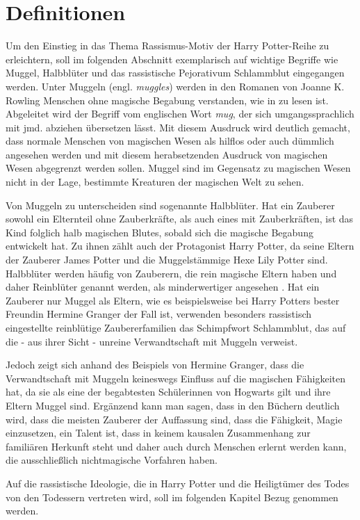 \section{Definitionen}
Um den Einstieg in das Thema \glqq Rassismus-Motiv der  \glq Harry Potter\grq-Reihe\grqq{} zu erleichtern, soll im folgenden Abschnitt exemplarisch auf wichtige Begriffe wie \glqq Muggel\grqq, \glqq Halbblüter\grqq{} und das rassistische Pejorativum \glqq Schlammblut\grqq{} eingegangen werden.
Unter \glqq Muggeln\grqq{} (engl. \emph{muggles}) werden in den Romanen von Joanne K. Rowling Menschen ohne magische Begabung verstanden, wie in \cite[S. \,61]{JKR97} zu lesen ist. 
Abgeleitet wird der Begriff vom englischen Wort \emph{mug}, der sich umgangssprachlich mit \glqq jmd. abziehen\grqq{} übersetzen lässt. 
Mit diesem Ausdruck wird deutlich gemacht, dass \glqq normale\grqq{} Menschen von magischen Wesen als hilflos oder auch dümmlich angesehen werden und mit diesem herabsetzenden Ausdruck von magischen Wesen abgegrenzt werden sollen.
Muggel sind im Gegensatz zu magischen Wesen nicht in der Lage, bestimmte Kreaturen der magischen Welt zu sehen.

Von Muggeln zu unterscheiden sind sogenannte \glqq Halbblüter\grqq. 
Hat ein Zauberer sowohl ein Elternteil ohne Zauberkräfte, als auch eines mit Zauberkräften, ist das Kind folglich halb magischen \glqq Blutes\grqq, sobald sich die magische Begabung entwickelt hat. 
Zu ihnen zählt auch der Protagonist Harry Potter, da seine Eltern der Zauberer James Potter und die Muggelstämmige Hexe Lily Potter sind.
Halbblüter werden häufig von Zauberern, die rein magische Eltern haben und daher \glqq Reinblüter\grqq{} genannt werden, als minderwertiger angesehen \cite[S.\,220]{JKR03}. 
Hat ein Zauberer nur Muggel als Eltern, wie es beispielsweise bei Harry Potters bester Freundin Hermine Granger der Fall ist, verwenden besonders rassistisch eingestellte reinblütige Zaubererfamilien das Schimpfwort \glqq Schlammblut\grqq, das auf die - aus ihrer Sicht -  \glqq unreine\grqq{} Verwandtschaft mit Muggeln verweist.

Jedoch zeigt sich anhand des Beispiels von Hermine Granger, dass die Verwandtschaft mit Muggeln keineswegs Einfluss auf die magischen Fähigkeiten hat, da sie als eine der begabtesten Schülerinnen von Hogwarts gilt und ihre Eltern Muggel sind.
Ergänzend kann man sagen, dass in den Büchern deutlich wird, dass die meisten Zauberer der Auffassung sind, dass die Fähigkeit, Magie einzusetzen, ein Talent ist, dass in keinem kausalen Zusammenhang zur familiären Herkunft steht und daher auch durch Menschen erlernt werden kann, die ausschließlich nichtmagische Vorfahren haben. 

Auf die rassistische Ideologie, die in \glqq Harry Potter und die Heiligtümer des Todes\grqq{} von den Todessern vertreten wird, soll im folgenden Kapitel Bezug genommen werden.



